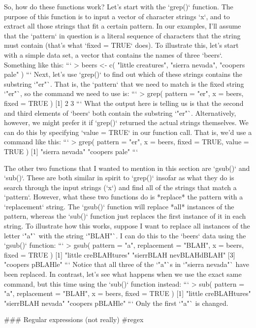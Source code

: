 So, how do these functions work? Let's start with the `grep()` function. The purpose of this function is to input a  vector of character strings `x`, and to extract all those strings that fit a certain pattern. In our examples, I'll assume that the `pattern` in question is a literal sequence of characters that the string must contain (that's what `fixed = TRUE` does). To illustrate this, let's start with a simple data set, a vector that contains the names of three `beers`. Something like this:
```
> beers <- c( "little creatures", "sierra nevada", "coopers pale" )
```
Next, let's use `grep()` to find out which of these strings contains the substring `"er"`. That is, the `pattern` that we need to match is the fixed string `"er"`, so the command we need to use is:
```
> grep( pattern = "er", x = beers, fixed = TRUE )
[1] 2 3
```
What the output here is telling us is that the second and third elements of `beers` both contain the substring `"er"`. Alternatively, however, we might prefer it if `grep()` returned the actual strings themselves. We can do this by specifying `value = TRUE` in our function call. That is, we'd use a command like this:
```
> grep( pattern = "er", x = beers, fixed = TRUE, value = TRUE )
[1] "sierra nevada" "coopers pale"
```


The other two functions that I wanted to mention in this section are `gsub()` and `sub()`. These are both similar in spirit to `grep()` insofar as what they do is search through the input strings (`x`) and find all of the strings that match a `pattern`. However, what these two functions do is *replace* the pattern with a `replacement` string. The `gsub()` function will replace *all* instances of the pattern, whereas the `sub()` function just replaces the first instance of it in each string. To illustrate how this works, suppose I want to replace all instances of the letter `"a"` with the string `"BLAH"`. I can do this to the `beers` data using the `gsub()` function:
```
> gsub( pattern = "a", replacement = "BLAH", x = beers, fixed = TRUE )
[1] "little creBLAHtures"    "sierrBLAH nevBLAHdBLAH"
[3] "coopers pBLAHle" 
```
Notice that all three of the `"a"`s in `"sierra nevada"` have been replaced. In contrast, let's see what happens when we use the exact same command, but this time using the `sub()` function instead:
```
> sub( pattern = "a", replacement = "BLAH", x = beers, fixed = TRUE )
[1] "little creBLAHtures" "sierrBLAH nevada"    "coopers pBLAHle"  
```
Only the first `"a"` is changed.

### Regular expressions (not really) {#regex}

